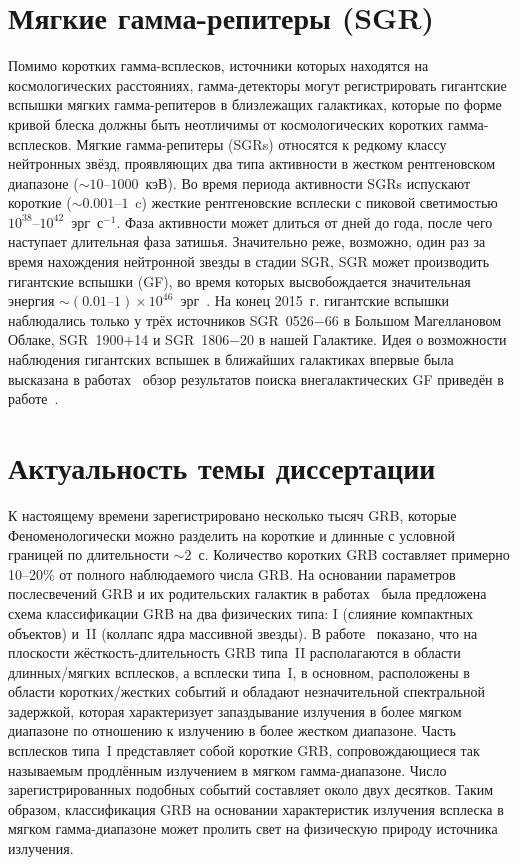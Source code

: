 \section*{Мягкие гамма-репитеры (SGR)}
Помимо коротких гамма-всплесков, источники которых находятся на космологических расстояниях,
гамма-детекторы могут регистрировать гигантские вспышки мягких гамма-репитеров 
в близлежащих галактиках, которые по форме кривой блеска должны быть неотличимы от 
космологических коротких гамма-всплесков. Мягкие гамма-репитеры (SGRs) относятся 
к редкому классу нейтронных звёзд, проявляющих 
два типа активности в жестком рентгеновском диапазоне ($\sim 10\textrm{--}1000$~кэВ). 
Во время периода активности SGRs испускают короткие ($\sim0.001\textrm{--}1$~c) жесткие рентгеновские всплески 
с пиковой светимостью $10^{38}\textrm{--}10^{42}$~эрг~с$^{-1}$. Фаза активности может длиться 
от дней до года, после чего наступает длительная фаза затишья. Значительно реже, 
возможно, один раз за время нахождения нейтронной звезды в стадии SGR, SGR может 
производить гигантские вспышки (GF), во время которых высвобождается значительная 
энергия $\sim(0.01\textrm{--}1)\times 10^{46}$~эрг~\citep[см. обзор][]{Mereghetti2013}.
На конец 2015~г. гигантские вспышки наблюдались только у трёх источников 
SGR~0526$-$66 в Большом Магеллановом Облаке, SGR~1900$+$14 и SGR~1806$-$20 в нашей Галактике.
Идея о возможности наблюдения гигантских вспышек в ближайших галактиках впервые была высказана 
в работах~\citep{Mazets1981,Mazets1982} обзор результатов поиска 
внегалактических GF приведён в работе~\citep{Hurley2011}.

\section*{Актуальность темы диссертации}
К настоящему времени зарегистрировано несколько тысяч GRB, которые
Феноменологически можно разделить на короткие и длинные с условной 
границей по длительности $\sim 2$~с. 
Количество коротких GRB составляет примерно 10--20\% от полного наблюдаемого числа GRB.
На основании параметров послесвечений GRB и их родительских галактик в 
работах~\citep{Zhang_2006,Zhang_2009} была предложена 
схема классификации GRB на два физических типа: I (слияние компактных объектов) 
и~II (коллапс ядра массивной звезды). В работе~\citep{Zhang_2009} показано,
что на плоскости жёсткость-длительность GRB типа~II располагаются в области 
длинных/мягких всплесков, а всплески типа~I, в основном, расположены в области коротких/жестких 
событий и обладают незначительной спектральной задержкой, 
которая характеризует запаздывание излучения в более мягком диапазоне по отношению 
к излучению в более жестком диапазоне.
Часть всплесков типа~I представляет собой короткие GRB, сопровождающиеся так 
называемым продлённым излучением в мягком гамма-диапазоне.
Число зарегистрированных подобных событий составляет около двух десятков.
Таким образом, классификация GRB на основании характеристик излучения всплеска 
в мягком гамма-диапазоне может пролить свет на физическую природу источника излучения.

